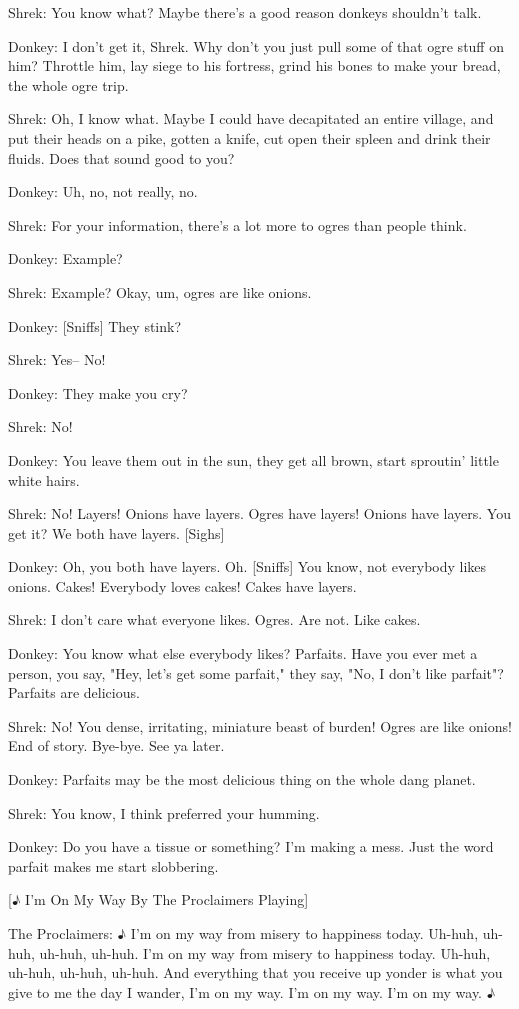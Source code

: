 \documentclass{article}
\begin{document}
Shrek:
You know what? Maybe there's a good reason donkeys shouldn't talk.

Donkey:
I don't get it, Shrek. Why don't you just pull some of that ogre stuff on him? Throttle him, lay siege to his fortress, grind his bones to make your bread, the whole ogre trip.

Shrek:
Oh, I know what. Maybe I could have decapitated an entire village, and put their heads on a pike, gotten a knife, cut open their spleen and drink their fluids. Does that sound good to you?

Donkey:
Uh, no, not really, no.

Shrek:
For your information, there's a lot more to ogres than people think.

Donkey:
Example?

Shrek:
Example? Okay, um, ogres are like onions.

Donkey:
[Sniffs] They stink?

Shrek:
Yes-- No!

Donkey:
They make you cry?

Shrek:
No!

Donkey:
You leave them out in the sun, they get all brown, start sproutin' little white hairs.

Shrek:
No! Layers! Onions have layers. Ogres have layers! Onions have layers. You get it? We both have layers. [Sighs]

Donkey:
Oh, you both have layers. Oh. [Sniffs] You know, not everybody likes onions. Cakes! Everybody loves cakes! Cakes have layers.

Shrek:
I don't care what everyone likes. Ogres. Are not. Like cakes.

Donkey:
You know what else everybody likes? Parfaits. Have you ever met a person, you say, "Hey, let's get some parfait," they say, "No, I don't like parfait"? Parfaits are delicious.

Shrek:
No! You dense, irritating, miniature beast of burden! Ogres are like onions! End of story. Bye-bye. See ya later.

Donkey:
Parfaits may be the most delicious thing on the whole dang planet.

Shrek:
You know, I think preferred your humming.

Donkey:
Do you have a tissue or something? I'm making a mess. Just the word parfait makes me start slobbering.

[♪ I'm On My Way By The Proclaimers Playing]

The Proclaimers:
♪ I'm on my way from misery to happiness today. Uh-huh, uh-huh, uh-huh, uh-huh. I'm on my way from misery to happiness today. Uh-huh, uh-huh, uh-huh, uh-huh. And everything that you receive up yonder is what you give to me the day I wander, I'm on my way. I'm on my way. I'm on my way. ♪
\end{document}
